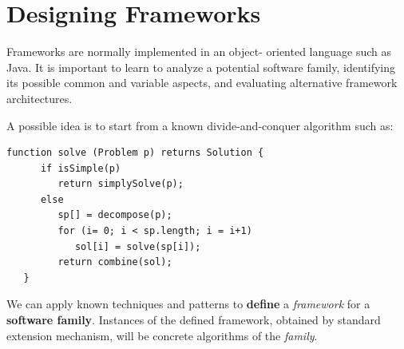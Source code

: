 \section{Designing Frameworks}
Frameworks are normally implemented in an object-
oriented language such as Java.
It is important to learn to analyze a potential software family, identifying
its possible common and variable aspects, and evaluating
alternative framework architectures.
\nl

A possible idea is to start from a known divide-and-conquer algorithm such as:
\begin{lstlisting}[label={lst:divideandconquer_example},caption={Example pseudocode of a Divide-and-Conquer algorithm}]
   function solve (Problem p) returns Solution { 
      if isSimple(p)
         return simplySolve(p);
      else
         sp[] = decompose(p);
         for (i= 0; i < sp.length; i = i+1)
            sol[i] = solve(sp[i]);
         return combine(sol);
   }
\end{lstlisting}
We can apply known techniques and patterns to \textbf{define} a
\textit{framework} for a \textbf{software family}.
Instances of the defined framework, obtained by standard
extension mechanism, 
will be concrete algorithms of the \textit{family}.

